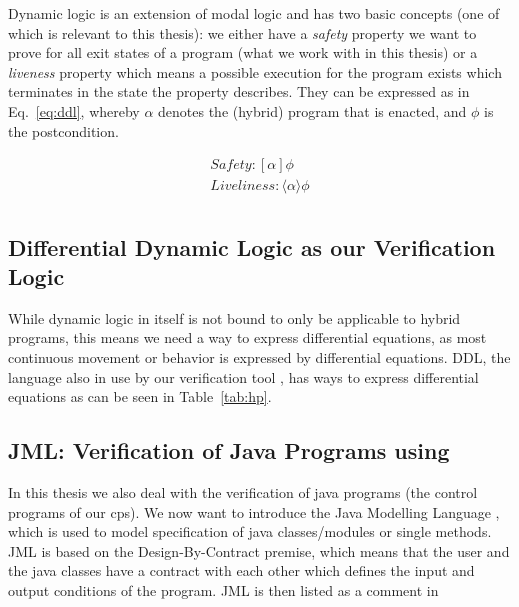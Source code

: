 Dynamic logic is an extension of modal logic and has two basic concepts (one of which is relevant to this thesis): we either have a \textit{safety} property we want to prove for all exit states of a program (what we work with in this thesis) or a \textit{liveness} property which means a possible execution for the program exists which terminates in the state the property describes. They can be expressed as in Eq.~\ref{eq:ddl}, whereby \(\alpha\) denotes the (hybrid) program that is enacted, and \(\phi\) is the postcondition.

\begin{equation}
	\label{eq:ddl}
	\begin{split}
		Safety: [\alpha]\phi \\
		Liveliness: \langle\alpha\rangle\phi \\
	\end{split}
\end{equation}

\subsection{Differential Dynamic Logic as our Verification Logic}
\label{subsec:DDL}

While dynamic logic in itself is not bound to only be applicable to hybrid programs, this means we need a way to express differential equations, as most continuous movement or behavior is expressed by differential equations. DDL, the language also in use by our verification tool \keym, has ways to express differential equations as can be seen in Table~\ref{tab:hp}.

\subsection{JML: Verification of Java Programs using \key}
\label{subsec:jml}

In this thesis we also deal with the verification of java programs (the control programs of our cps). We now want to introduce the Java Modelling Language , which is used to model specification of java classes/modules or single methods. JML is based on the Design-By-Contract premise, which means that the user and the java classes have a contract with each other which defines the input and output conditions of the program. JML is then listed as a comment in

